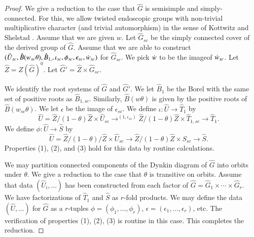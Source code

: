 \begin{proof}
  We give a reduction to the case that $\hat G$ is semisimple and
  simply-connected.  For this, we allow twisted endoscopic groups with
  non-trivial multiplicative character (and trivial automorphism) in
  the sense of Kottwitz and Shelstad \cite{kottwitz1999foundations}.
  Assume that we are given $w$.  Let $\hat G_{sc}$ be
  the simply connected cover of the derived group of $\hat G$.  Assume
  that we are able to construct $(\hat U_{sc},\hat
  B(w_{sc}\theta),\hat
  B_{1,\sc},\iota_{sc},\phi_{sc},\epsilon_{sc},\dot w_{sc})$ for $\hat
  G_{sc}$.  
  We pick $\dot w$ to be the imageof $\dot w_{sc}$.  Let
  $\hat Z = Z(\hat G)^0$.  Let $\hat G' = \hat Z\times \hat G_{sc}$.

  We identify the root systems of $\hat G$ and $\hat G'$.  We let
  $\hat B_1$ be the Borel with the same set of positive roots as $\hat
  B_{1,sc}$.  Similarly, $\hat B(w\theta)$ is given by the positive
  roots of $\hat B(w_{sc}\theta)$.  We let $\epsilon$ be the image of
  $\epsilon_{sc}$.  We define $\iota:\hat U\to \hat T_1$ by
  \[
  \hat U = \hat Z/(1-\theta)\hat Z \times \hat U_{sc} \to^{(1,\iota_{sc})}
\hat Z/(1-\theta)\hat Z\times \hat T_{1,sc} \to \hat T_1.
  \]
  We define $\phi:\hat U\to \hat S$ by
  \[
  \hat U = \hat Z/(1-\theta)/\hat Z \times \hat U_{sc}\to \hat Z/(1-\theta)\hat Z \times 
  \hat S_{sc}\to \hat S.
  \]
  Properties (1), (2), and (3) hold for this data by routine calculations.

  We may partition connected components of the Dynkin diagram of $\hat
  G$ into orbits under $\theta$.  We give a reduction to the case that
  $\theta$ is transitive on orbits.  Assume that data $(\hat U_i,\ldots)$
  has been constructed from each factor of $\hat G = \hat G_1\times\cdots\times \hat G_r$.
   We have factorizations of $\hat T_1$ and $\hat S$ as
  $r$-fold products.  We may define the data $(\hat U,\ldots)$ for $\hat G$ as
  a $r$-tuples $\phi = (\phi_1,\ldots,\phi_r)$, $\epsilon =
  (\epsilon_{1},\ldots,\epsilon_{r})$, etc.  The verification of properties (1), (2), (3)
  is routine in this case.  This completes the reduction.


\end{proof}
